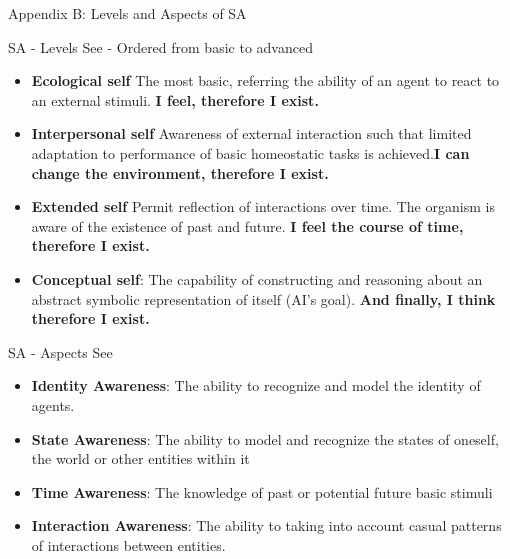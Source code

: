 \documentclass[unknownkeysallowed]{beamer}
\begin{document}
\begin{frame}{Appendix B: Levels and Aspects of SA}

\end{frame}

\begin{frame}{SA - Levels}
	See \textbf{\cite{lewis-2017-towards-a-framework-for-the-levels-and-aspects-of-self-aware-computing-systems}} - Ordered from basic to advanced
	\begin{itemize}
		\item \textbf{Ecological self} The most basic, referring the ability of an agent to react to an external stimuli. \textbf{I feel, therefore I exist.}
		
		\item \textbf{Interpersonal self} Awareness of external interaction such that limited adaptation to performance of basic homeostatic tasks is achieved.\textbf{I can change the environment, therefore I exist.}
		
		\item \textbf{Extended self}  Permit reflection of interactions over time. The organism is aware of the existence of past and future. \textbf{I feel the course of time, therefore I exist.}
		
		\item \textbf{Conceptual self}: The capability of constructing and reasoning
		about an abstract symbolic representation of itself (AI's goal). \textbf{And finally, I think therefore I exist.}
	\end{itemize}
\end{frame}

\begin{frame}{SA - Aspects}
	See \textbf{\cite{lewis-2017-towards-a-framework-for-the-levels-and-aspects-of-self-aware-computing-systems}}
	\begin{itemize}
	\item \textbf{Identity Awareness}: The ability to recognize and model the identity of agents.
	\item \textbf{State Awareness}: The ability to model and recognize the states of oneself, the world or other entities within it
	\item \textbf{Time Awareness}: The knowledge of past or potential future basic stimuli
	\item \textbf{Interaction Awareness}: The ability to taking into account casual patterns of
	interactions between entities.
	\end{itemize}
\end{frame}
\end{document}
